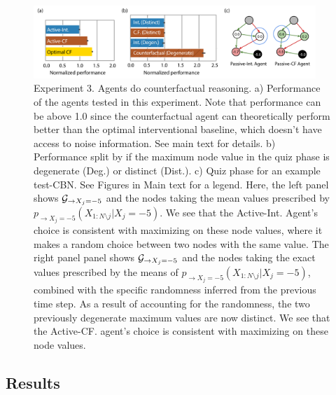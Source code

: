 \begin{figure}[t!]
\centering
   \includegraphics[width=0.95\textwidth]{figures/fig_expt3.pdf}
    \caption{Experiment 3.  Agents do counterfactual reasoning. a) Performance of the agents tested in this experiment. Note that performance can be above 1.0 since the counterfactual agent can theoretically perform better than the optimal interventional baseline, which doesn't have access to noise information. See main text for details. b) Performance split by if the maximum node value in the quiz phase is degenerate (Deg.) or distinct (Dist.). c) Quiz phase for an example test-CBN. See Figures in Main text for a legend. Here, the left panel shows ${\cal G}_{\rightarrow X_j=-5}$ and the nodes taking the mean values prescribed by $p_{\rightarrow X_j=-5}(X_{1:N\setminus j }|X_j=-5)$. We see that the Active-Int. Agent's choice is consistent with maximizing on these node values, where it makes a random choice between two nodes with the same value. The right panel panel shows ${\cal G}_{\rightarrow X_j=-5}$ and the nodes taking the exact values prescribed by the means of $p_{\rightarrow X_j=-5}(X_{1:N\setminus j }|X_j=-5)$, combined with the specific randomness inferred from the previous time step. As a result of accounting for the randomness, the two previously degenerate maximum values are now distinct. We see that the Active-CF. agent's choice is consistent with maximizing on these node values.}%
    \vspace{-1cm}
    \label{fig:expt3}%
\end{figure}



\subsection{Results}

